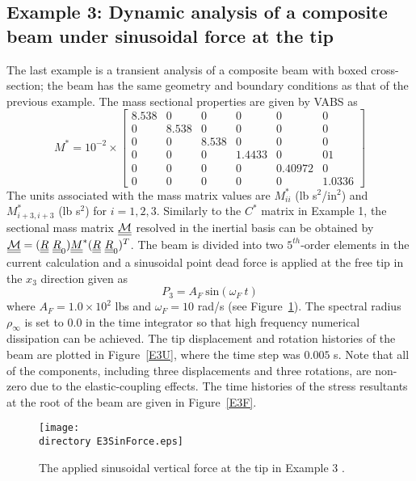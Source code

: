 \subsection{Example 3: Dynamic analysis of a composite beam under sinusoidal force at the tip}

The last example is a transient analysis of a composite beam with boxed
cross-section; the beam has the same
geometry and boundary conditions as that of the previous example. The mass
sectional properties are given by VABS \cite{Yu-etal:2002,Wang-Yu:2012} as
\begin{equation}
    \label{E3Mass}
    M^* = 10^{-2} \times \begin{bmatrix}
	8.538 & 0     & 0     & 0      & 0      & 0      \\
	0       & 8.538 & 0     & 0      & 0      & 0      \\
	0       & 0     & 8.538 & 0      & 0      & 0      \\
	0       & 0     & 0     & 1.4433  & 0  & 01 \\
	0       & 0     & 0     & 0  & 0.40972  &0 \\
	0       & 0     & 0     & 0 & 0 & 1.0336
\end{bmatrix}    
\end{equation}
The units associated with the mass matrix values are $M_{ii}^*$ (lb s$^2$/in$^2$) and $M_{i+3,i+3}^*$ (lb s$^2$) for $i = 1,2,3$. Similarly to the $C^*$ matrix in Example 1, the sectional mass matrix $\underline{\underline{\mathcal{M}}}$ resolved in the inertial basis can be obtained by $\underline{\underline{\mathcal{M}}} = (\underline{\underline{R}}~\underline{\underline{R}}_0) \underline{\underline{M}}^*(\underline{\underline{R}}~\underline{\underline{R}}_0)^T$. The beam is divided into two $5^{th}$-order elements in the current calculation and a sinusoidal point dead force is applied at the free tip in the $x_3$ direction given as
\begin{equation}
    \label{E3AppliedForce}
    P_3 = A_F~\text{sin}(\omega_F~t)
\end{equation}
where $A_F = 1.0 \times 10^2$ lbs and $\omega_F = 10$ rad/s (see
Figure~\ref{E3SinForce}). 
The spectral radius $\rho_\infty$ is set to $0.0$ in the time integrator so that high frequency numerical dissipation can be achieved. The tip displacement and rotation histories of the beam are plotted in
Figure~\ref{E3U}, where the time step was $0.005$ s. Note that all of the components, including three displacements and three rotations, are non-zero due to the elastic-coupling effects. The time histories of the stress resultants at the root of the beam are given in Figure~\ref{E3F}.
\begin{figure}
    \centering
    \texttt{[image: \\directory E3SinForce.eps]}
    \caption{The applied sinusoidal vertical force at the tip in Example 3 .}
    \label{E3SinForce}
\end{figure}


